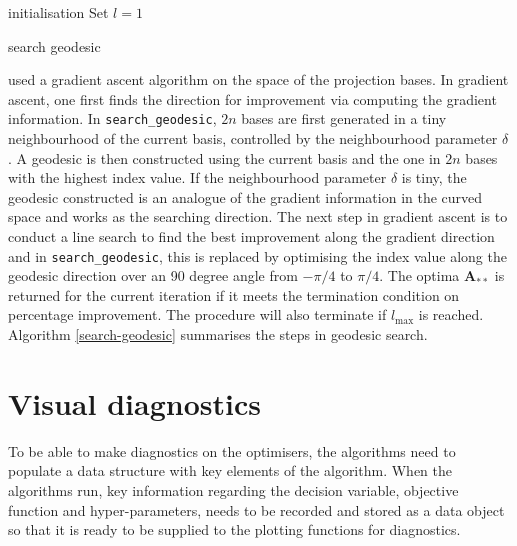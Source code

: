 \documentclass[12pt]{article}
\begin{document}
\begin{algorithm}
\SetAlgoLined
{}
  initialisation\;
  Set $l = 1$\;
  \caption{search geodesic}
  \label{search-geodesic}
\end{algorithm}

\citet{cook1995grand} used a gradient ascent algorithm on the space of the projection bases. In gradient ascent, one first finds the direction for improvement via computing the gradient information. In \texttt{search\_geodesic}, \(2n\) bases are first generated in a tiny neighbourhood of the current basis, controlled by the neighbourhood parameter \(\delta\). A geodesic is then constructed using the current basis and the one in \(2n\) bases with the highest index value. If the neighbourhood parameter \(\delta\) is tiny, the geodesic constructed is an analogue of the gradient information in the curved space and works as the searching direction. The next step in gradient ascent is to conduct a line search to find the best improvement along the gradient direction and in \texttt{search\_geodesic}, this is replaced by optimising the index value along the geodesic direction over an 90 degree angle from \(-\pi/4\) to \(\pi/4\). The optima \(\mathbf{A}_{**}\) is returned for the current iteration if it meets the termination condition on percentage improvement. The procedure will also terminate if \(l_{\max}\) is reached. Algorithm \ref{search-geodesic} summarises the steps in geodesic search.

\hypertarget{vis-diag}{%
\section{Visual diagnostics}\label{vis-diag}}

To be able to make diagnostics on the optimisers, the algorithms need to populate a data structure with key elements of the algorithm. When the algorithms run, key information regarding the decision variable, objective function and hyper-parameters, needs to be recorded and stored as a data object so that it is ready to be supplied to the plotting functions for diagnostics.
\end{document}
